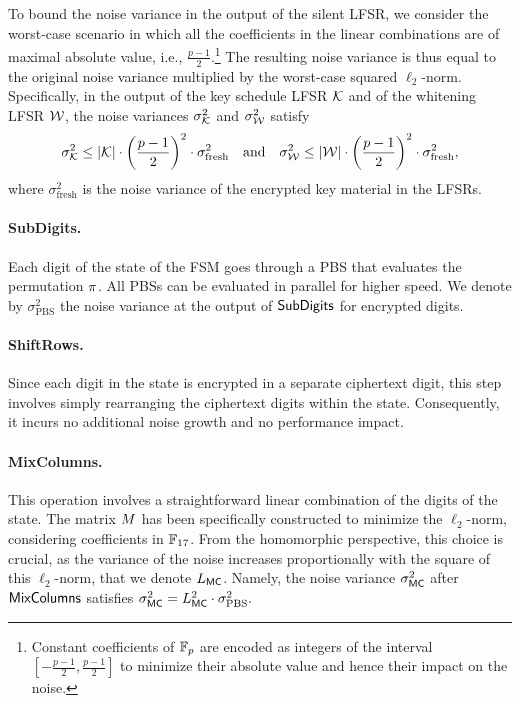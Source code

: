 To bound the noise variance in the output of the silent LFSR, we consider the worst-case scenario in which all the coefficients in the linear combinations are of maximal absolute value, i.e., $\frac{p-1}{2}$.\footnote{Constant coefficients of $\mathbb{F}_{p}$ are encoded as integers of the interval $[-\frac{p-1}{2}, \frac{p-1}{2}]$ to minimize their absolute value and hence their impact on the noise.} The resulting noise variance is thus equal to the original noise variance multiplied by the worst-case squared $\ell_2$-norm. Specifically, in the output of the key schedule LFSR $\mathcal{K}$ and of the whitening LFSR $\mathcal{W}$, the noise variances $\sigma_{\mathcal{K}}^2$ and $\sigma_{\mathcal{W}}^2$ satisfy
\begin{equation}
  \sigma_{\mathcal{K}}^2 \leq | \mathcal{K} | \cdot \left(\frac{p-1}2\right)^2 \cdot \sigma_{\text{fresh}}^2 ~~~\text{and}~~~ \sigma_{\mathcal{W}}^2 \leq | \mathcal{W} | \cdot \left(\frac{p-1}2\right)^2 \cdot \sigma_{\text{fresh}}^2,
\end{equation}
where $\sigma_{\text{fresh}}^2$ is the noise variance of the encrypted key material in the LFSRs.

\paragraph{SubDigits.} Each digit of the state of the FSM goes through a PBS that evaluates the permutation $\pi$. All PBSs can be evaluated in parallel for higher speed. We denote by $\sigma_{\text{PBS}}^2$ the noise variance at the output of $\text{\textsf{SubDigits}}$ for encrypted digits.


\paragraph{ShiftRows.} Since each digit in the state is encrypted in a separate ciphertext digit, this step involves simply rearranging the ciphertext digits within the state. Consequently, it incurs no additional noise growth and no performance impact.

\paragraph{MixColumns.} This operation involves a straightforward linear combination of the digits of the state. The matrix $M$ has been specifically constructed to minimize the $\ell_2$-norm, considering coefficients in $\mathbb{F}_{17}$. %
From the homomorphic perspective, this choice is crucial, as the variance of the noise increases proportionally with the square of this $\ell_2$-norm, that we denote $L_{\text{\textsf{MC}}}$. Namely, the noise variance $\sigma^2_{\text{\textsf{MC}}}$ after  $\text{\textsf{MixColumns}}$ satisfies $\sigma^2_{\text{\textsf{MC}}} = L_{\text{\textsf{MC}} }^2 \cdot \sigma_{\text{PBS}}^2.$



